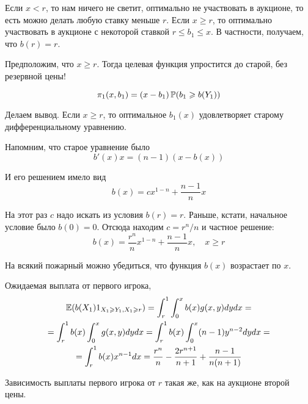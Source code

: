 \begin{enumerate}
Если $ x<r $, то нам ничего не светит, оптимально не участвовать в аукционе, то есть можно делать любую ставку меньше $ r $. Если $ x\geq r $, то оптимально участвовать в аукционе с некоторой ставкой $ r\leq b_{1}\leq x $. В частности, получаем, что $ b(r)=r$.



Предположим, что $ x\geq r $. Тогда целевая функция упростится до старой, без резервной цены!

\begin{equation}
\pi_{1}(x,b_{1})=(x-b_{1})\P(b_{1}\geq b(Y_{1}))
\end{equation}

Делаем вывод. Если $x\geq r$, то оптимальное $ b_{1}(x) $ удовлетворяет старому дифференциальному уравнению.

Напомним, что старое уравнение было
\begin{equation}
b'(x)x=(n-1)(x-b(x))
\end{equation}

И его решением имело вид
\begin{equation}
b(x)=cx^{1-n}+\frac{n-1}{n}x
\end{equation}

На этот раз $ c $ надо искать из условия $ b(r)=r $. Раньше, кстати, начальное условие было $b(0)=0 $. Отсюда находим $ c=r^{n}/n $ и частное решение:
\begin{equation}
b(x)=\frac{r^{n}}{n}x^{1-n}+\frac{n-1}{n}x, \quad x\geq r
\end{equation}

На всякий пожарный можно убедиться, что функция $b(x)$ возрастает по $ x $.

Ожидаемая выплата от первого игрока,
\begin{multline}
\E(b(X_{1})1_{X_{1}\geq Y_{1},X_{1}\geq r})=\int_{r}^{1} \int_{0}^{x} b(x)g(x,y)dy dx =\\
=\int_{r}^{1} b(x) \int_{0}^{x} g(x,y)dy dx =\int_{r}^{1} b(x) \int_{0}^{x} (n-1) y^{n-2} dy dx =\\
=\int_{r}^{1}b(x) x^{n-1} dx=\frac{r^{n}}{n}-\frac{2r^{n+1}}{n+1}+\frac{n-1}{n(n+1)}
\end{multline}

Зависимость выплаты первого игрока от $ r $ такая же, как на аукционе второй цены.



\end{enumerate}
